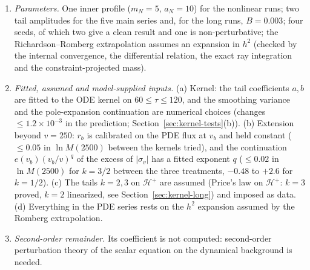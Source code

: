 \documentclass[11pt]{article}
\begin{document}
\begin{enumerate}
\item \emph{Parameters.} One inner profile ($m_N=5$, $a_N=10$) for the nonlinear runs; two tail amplitudes for the five main series and, for the long runs, $B=0.003$; four seeds, of which two give a clean result and one is non-perturbative; the Richardson--Romberg extrapolation assumes an expansion in $h^{2}$ (checked by the internal convergence, the differential relation, the exact ray integration and the constraint-projected mass).
\item \emph{Fitted, assumed and model-supplied inputs.} (a) Kernel: the tail coefficients $a,b$ are fitted to the ODE kernel on $60\le\tau\le120$, and the smoothing variance and the pole-expansion continuation are numerical choices (changes $\le1.2\times10^{-3}$ in the prediction; Section~\ref{sec:kernel-tests}(b)). (b) Extension beyond $v=250$: $r_b$ is calibrated on the PDE flux at $v_b$ and held constant ($\le0.05$ in $\ln M(2500)$ between the kernels tried), and the continuation $e(v_b)(v_b/v)^q$ of the excess of $|\sigma_v|$ has a fitted exponent $q$ ($\le0.02$ in $\ln M(2500)$ for $k=3/2$ between the three treatments, $-0.48$ to $+2.6$ for $k=1/2$). (c) The tails $k=2,3$ on $\mathcal H^+$ are assumed (Price's law on $\mathcal H^+$: $k=3$ proved, $k=2$ linearized, see Section~\ref{sec:kernel-long}) and imposed as data. (d) Everything in the PDE series rests on the $h^2$ expansion assumed by the Romberg extrapolation.
\item \emph{Second-order remainder.} Its coefficient is not computed: second-order perturbation theory of the scalar equation on the dynamical background is needed.
\end{enumerate}
\end{document}
